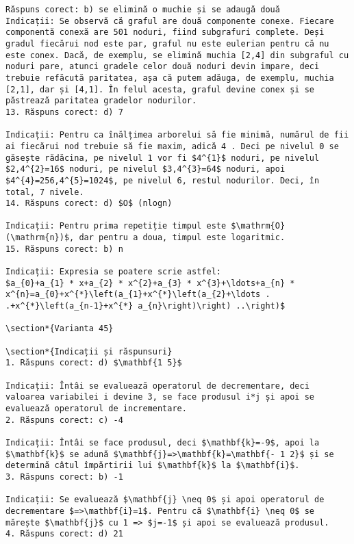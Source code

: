 \begin{verbatim}
Răspuns corect: b) se elimină o muchie și se adaugă două
Indicații: Se observă că graful are două componente conexe. Fiecare componentă conexă are 501 noduri, fiind subgrafuri complete. Deși gradul fiecărui nod este par, graful nu este eulerian pentru că nu este conex. Dacă, de exemplu, se elimină muchia [2,4] din subgraful cu noduri pare, atunci gradele celor două noduri devin impare, deci trebuie refăcută paritatea, așa că putem adăuga, de exemplu, muchia [2,1], dar și [4,1]. În felul acesta, graful devine conex și se păstrează paritatea gradelor nodurilor.
13. Răspuns corect: d) 7

Indicații: Pentru ca înălțimea arborelui să fie minimă, numărul de fii ai fiecărui nod trebuie să fie maxim, adică 4 . Deci pe nivelul 0 se găsește rădăcina, pe nivelul 1 vor fi $4^{1}$ noduri, pe nivelul $2,4^{2}=16$ noduri, pe nivelul $3,4^{3}=64$ noduri, apoi $4^{4}=256,4^{5}=1024$, pe nivelul 6, restul nodurilor. Deci, în total, 7 nivele.
14. Răspuns corect: d) $O$ (nlogn)

Indicații: Pentru prima repetiție timpul este $\mathrm{O}(\mathrm{n})$, dar pentru a doua, timpul este logaritmic.
15. Răspuns corect: b) n

Indicații: Expresia se poatere scrie astfel:
$a_{0}+a_{1} * x+a_{2} * x^{2}+a_{3} * x^{3}+\ldots+a_{n} * x^{n}=a_{0}+x^{*}\left(a_{1}+x^{*}\left(a_{2}+\ldots . .+x^{*}\left(a_{n-1}+x^{*} a_{n}\right)\right) ..\right)$

\section*{Varianta 45}

\section*{Indicații și răspunsuri}
1. Răspuns corect: d) $\mathbf{1 5}$

Indicații: Întâi se evaluează operatorul de decrementare, deci valoarea variabilei i devine 3, se face produsul i*j și apoi se evaluează operatorul de incrementare.
2. Răspuns corect: c) -4

Indicații: Întâi se face produsul, deci $\mathbf{k}=-9$, apoi la $\mathbf{k}$ se adună $\mathbf{j}=>\mathbf{k}=\mathbf{- 1 2}$ și se determină câtul împărtirii lui $\mathbf{k}$ la $\mathbf{i}$.
3. Răspuns corect: b) -1

Indicații: Se evaluează $\mathbf{j} \neq 0$ și apoi operatorul de decrementare $=>\mathbf{i}=1$. Pentru că $\mathbf{i} \neq 0$ se mărește $\mathbf{j}$ cu 1 => $j=-1$ și apoi se evaluează produsul.
4. Răspuns corect: d) 21


\end{verbatim}
